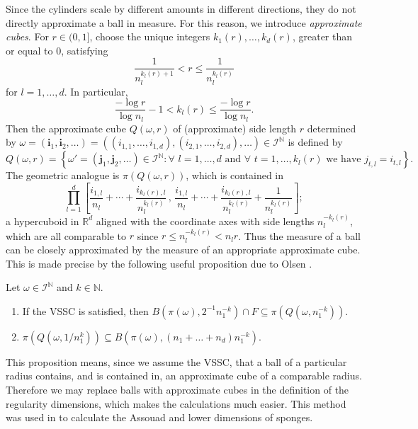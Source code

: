 Since the cylinders scale by different amounts in different directions, they do not directly approximate a ball in measure.  For this reason, we introduce \emph{approximate cubes}. For $r\in (0,1]$, choose the unique integers $k_1(r),\ldots,k_d(r)$, greater than or equal to 0, satisfying
\[
\frac{1}{n_l^{k_l(r)+1}}< r \leq \frac{1}{n_l^{k_l(r)}}
\]
for $l=1,\ldots,d$. In particular, 
\[
\frac{-\log r}{\log n_l}-1 < k_l(r) \leq \frac{-\log r}{\log n_l}.
\]
Then the approximate cube $Q(\omega, r)$ of (approximate) side length $r$ determined by $\omega =\left( \textbf{i}_1, \textbf{i}_2 , \ldots \right) =\left( (i_{1,1}, \dots, i_{1,d}), (i_{2,1}, \dots, i_{2,d}) , \ldots \right)    \in \mathcal{I}^{\mathbb{N}}$ is defined by
\[
Q(\omega, r)=\left\{ \omega'=\left( \textbf{j}_1, \textbf{j}_2 , \ldots \right)\in \mathcal{I}^{\mathbb{N}} : \forall \, \,  l=1, \ldots, d \text{ and } \forall\, \, t= 1, \ldots, k_l(r) \text{ we have } j_{t,l}=i_{t,l} \right\}.
\]
The geometric analogue is $\pi\left(Q(\omega, r)\right)$, which is contained in
\[ 
\prod_{l=1}^d \left[\frac{i_{1,l}}{n_l}+\cdots+\frac{i_{k_l(r),l}}{n_l^{k_l(r)}} \, , \, \frac{i_{1,l}}{n_l}+\cdots+\frac{i_{k_l(r),l}}{n_l^{k_l(r)}}+\frac{1}{n_l^{k_l(r)}} \right];
\]
a hypercuboid in $\mathbb{R}^d$ aligned with the coordinate axes with side lengths $n_l^{-k_l(r)}$, which are all comparable to $r$ since $ r \leq n_l^{-k_l(r)} < n_l r$.  Thus the measure of a ball can be closely approximated by the measure of an appropriate approximate cube.  This is made precise by the following useful proposition due to Olsen \cite[Proposition 6.2.1]{sponges}.
\begin{proposition} \label{ch-upper-reg:ballscubes}
	Let $\omega \in \mathcal{I}^{\mathbb{N}}$ and $k \in \mathbb{N}$.
	\begin{enumerate} 
		\item If the VSSC is satisfied, then $B\left( \pi(\omega), 2^{-1}n_1^{-k}\right)\cap F \subseteq \pi \left(Q\left( \omega, n_1^{-k} \right) \right).$ 
		\item  $\pi \left(Q\left( \omega, 1/n_1^k \right) \right) \subseteq B\left( \pi(\omega), (n_1+\dots+n_d)n_1^{-k}\right).$ 
	\end{enumerate}
\end{proposition}

This proposition means, since we assume the VSSC, that a ball of a particular radius contains, and is contained in, an approximate cube of a comparable radius.  Therefore we may replace balls with approximate cubes in the definition of the regularity dimensions, which makes the calculations much easier. This method was used in \cite[Proposition 3.1 and 3.5]{fraser-howroyd} to calculate the Assouad and lower dimensions of sponges. 

